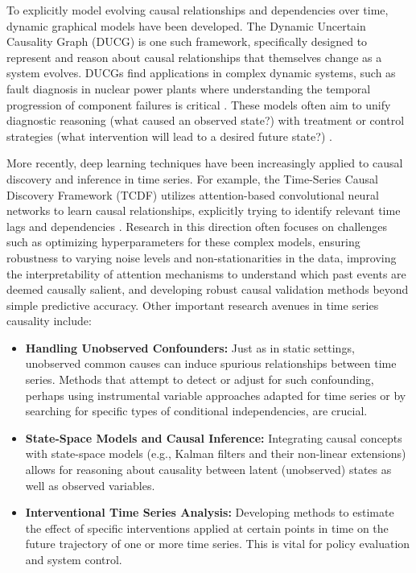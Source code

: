 {To explicitly model evolving causal relationships and dependencies over time, dynamic graphical models have been developed. The Dynamic Uncertain Causality Graph (DUCG) \cite{Zhang2012Dynamic} is one such framework, specifically designed to represent and reason about causal relationships that themselves change as a system evolves. DUCGs find applications in complex dynamic systems, such as fault diagnosis in nuclear power plants where understanding the temporal progression of component failures is critical \cite{Deng2018Cubic, Hu2017Accident}. These models often aim to unify diagnostic reasoning (what caused an observed state?) with treatment or control strategies (what intervention will lead to a desired future state?) \cite{Deng2020Towards}.

More recently, deep learning techniques have been increasingly applied to causal discovery and inference in time series. For example, the Time-Series Causal Discovery Framework (TCDF) utilizes attention-based convolutional neural networks to learn causal relationships, explicitly trying to identify relevant time lags and dependencies \cite{Nauta2019Causal}. Research in this direction often focuses on challenges such as optimizing hyperparameters for these complex models, ensuring robustness to varying noise levels and non-stationarities in the data, improving the interpretability of attention mechanisms to understand which past events are deemed causally salient, and developing robust causal validation methods beyond simple predictive accuracy. Other important research avenues in time series causality include:
\begin{itemize}
    \item \textbf{Handling Unobserved Confounders:} Just as in static settings, unobserved common causes can induce spurious relationships between time series. Methods that attempt to detect or adjust for such confounding, perhaps using instrumental variable approaches adapted for time series or by searching for specific types of conditional independencies, are crucial.
    \item \textbf{State-Space Models and Causal Inference:} Integrating causal concepts with state-space models (e.g., Kalman filters and their non-linear extensions) allows for reasoning about causality between latent (unobserved) states as well as observed variables.
    \item \textbf{Interventional Time Series Analysis:} Developing methods to estimate the effect of specific interventions applied at certain points in time on the future trajectory of one or more time series. This is vital for policy evaluation and system control.

\end{itemize}}
